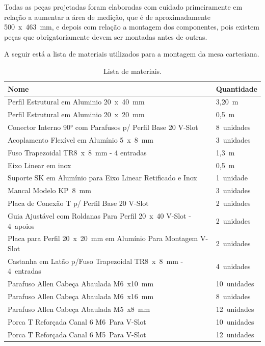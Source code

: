 Todas as peças projetadas foram elaboradas com cuidado primeiramente em relação a aumentar 
a área de medição, que é de aproximadamente 500~x~463~mm, e depois com relação a montagem dos 
componentes, pois existem peças que obrigatoriamente devem ser montadas antes de outras. 

A seguir está a lista de materiais utilizados para a montagem da mesa cartesiana.

\begin{table}[H]
    \footnotesize
    \centering
    \caption{Lista de materiais.}
    \begin{tabular}{ll}
        \hline
        \textbf{Nome} & \textbf{Quantidade}\\
        \hline
        Perfil Estrutural em Aluminio 20~x~40~mm & 3,20~m\\
        Perfil Estrutural em Aluminio 20~x~20~mm & 0,5~m\\
        Conector Interno 90° com Parafusos p/ Perfil Base 20 V-Slot & 8~unidades\\
        Acoplamento Flexível em Alumínio 5~x~8~mm & 3~unidades\\
        Fuso Trapezoidal TR8~x~8~mm - 4 entradas & 1,3~m\\
        Eixo Linear em inox & 0,5~m\\
        Suporte SK em Alumínio para Eixo Linear Retificado e Inox & 1~unidade\\
        Mancal Modelo KP~8~mm & 3~unidades\\
        Placa de Conexão T p/ Perfil Base 20 V-Slot &2~unidades\\
        Guia Ajustável com Roldanas Para Perfil 20~x~40 V-Slot - 4~apoios & 2~unidades\\
        Placa para Perfil 20~x~20~mm em Alumínio Para Montagem V-Slot & 2~unidades\\
        Castanha em Latão p/Fuso Trapezoidal TR8~x~8~mm - 4~entradas & 4~unidades\\
        Parafuso Allen Cabeça Abaulada M6~x10~mm & 10~unidades\\
        Parafuso Allen Cabeça Abaulada M6~x16~mm & 8~unidades\\
        Parafuso Allen Cabeça Abaulada M5~x8~mm & 12~unidades\\
        Porca T Reforçada Canal 6 M6~Para V-Slot & 10~unidades\\
        Porca T Reforçada Canal 6 M5~Para V-Slot & 12~unidades\\
        \hline       
    \end{tabular}
    \label{tab:listamateriais}
\end{table}

